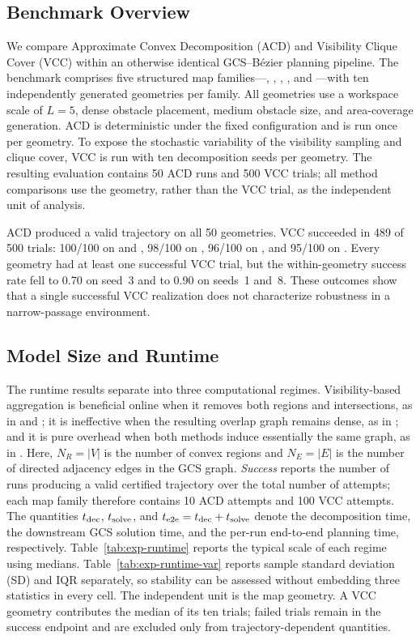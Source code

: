 \subsection{Benchmark Overview}
We compare Approximate Convex Decomposition (ACD) and Visibility Clique Cover
(VCC) within an otherwise identical GCS--B\'ezier planning pipeline. The
benchmark comprises five structured map families---,
, , , and ---with ten
independently generated geometries per family. All geometries use a workspace
scale of $L=5$, dense obstacle placement, medium obstacle size, and
area-coverage generation. ACD is deterministic under the fixed configuration
and is run once per geometry. To expose the stochastic variability of the
visibility sampling and clique cover, VCC is run with ten decomposition seeds
per geometry. The resulting evaluation contains 50 ACD runs and 500 VCC trials;
all method comparisons use the geometry, rather than the VCC trial, as the
independent unit of analysis.

ACD produced a valid trajectory on all 50 geometries. VCC succeeded in 489 of
500 trials: 100/100 on  and , 98/100 on
, 96/100 on , and 95/100 on . Every
geometry had at least one successful VCC trial, but the within-geometry success
rate fell to 0.70 on  seed~3 and to 0.90 on 
seeds~1 and~8. These outcomes show that a single successful VCC realization
does not characterize robustness in a narrow-passage environment.

\subsection{Model Size and Runtime}
The runtime results separate into three computational regimes. Visibility-based
aggregation is beneficial online when it removes both regions and
intersections, as in  and ; it is ineffective when
the resulting overlap graph remains dense, as in ; and it is
pure overhead when both methods induce essentially the same graph, as in
. Here, $N_R=|V|$ is the number of convex regions and $N_E=|E|$ is
the number of directed adjacency edges in the GCS graph.
\emph{Success} reports the number of runs producing a valid certified
trajectory over the total number of attempts; each map family therefore
contains 10 ACD attempts and 100 VCC attempts.
The quantities $t_{\rm dec}$, $t_{\rm solve}$, and
$t_{\rm e2e}=t_{\rm dec}+t_{\rm solve}$ denote the decomposition time,
the downstream GCS solution time, and the per-run end-to-end planning
time, respectively. Table~\ref{tab:exp-runtime} reports the typical scale of each
regime using medians. Table~\ref{tab:exp-runtime-var} reports sample standard
deviation (SD) and IQR separately, so stability can be assessed without
embedding three statistics in every cell. The independent unit is the map
geometry. A VCC geometry contributes the median of its ten trials; failed trials
remain in the success endpoint and are excluded only from trajectory-dependent
quantities.

